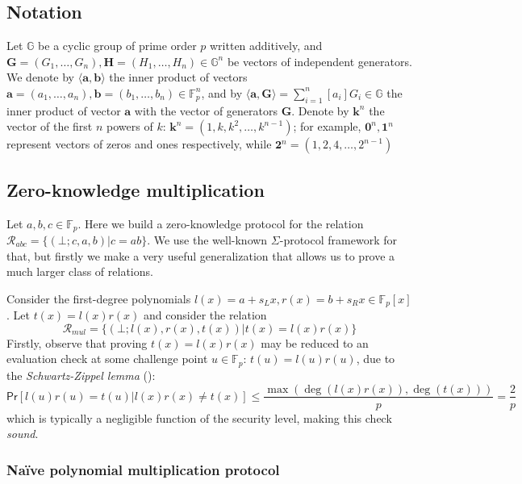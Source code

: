 \documentclass[../../book.tex]{subfiles}
\begin{document}
\subsection{Notation}
Let $\mathbb{G}$ be a cyclic group of prime order $p$ written additively, and $\mathbf{G} = (G_1, \dots, G_n), \mathbf{H} = (H_1, \dots, H_n) \in \mathbb{G}^n$ be vectors of independent generators. We denote by $\langle \mathbf{a,b} \rangle$ the inner product of vectors $\mathbf{a} = (a_1, \dots, a_n), \mathbf{b} = (b_1, \dots, b_n) \in \mathbb{F}_p^n$, and by $\langle \mathbf{a,G} \rangle = \sum_{i=1}^n [a_i] G_i \in \mathbb{G}$ the inner product of vector $\mathbf{a}$ with the vector of generators $\mathbf{G}$. Denote by $\mathbf{k}^n$ the vector of the first $n$ powers of $k$: $\mathbf{k}^n = (1, k, k^2, \dots, k^{n-1})$; for example, $\mathbf{0}^n, \mathbf{1}^n$ represent vectors of zeros and ones respectively, while $\mathbf{2}^{n} = (1, 2, 4, \dots, 2^{n-1})$

\subsection{Zero-knowledge multiplication}
Let $a,b,c \in \mathbb{F}_p$. Here we build a zero-knowledge protocol for the relation $\mathcal{R}_{abc} = \{ (\bot;c,a,b) \vert c=ab \}$. We use the well-known $\Sigma$-protocol framework for that, but firstly we make a very useful generalization that allows us to prove a much larger class of relations.

Consider the first-degree polynomials $l(x) = a + s_L x, r(x) = b + s_R x \in \mathbb{F}_p[x]$. Let $t(x) = l(x)r(x)$ and consider the relation
$$\mathcal{R}_{mul} = \{ (\bot;l(x),r(x),t(x)) \vert t(x) = l(x)r(x)\}$$
Firstly, observe that proving $t(x) = l(x)r(x)$ may be reduced to an evaluation check at some challenge point $u \in \mathbb{F}_p$: $t(u) = l(u)r(u)$, due to the \textit{Schwartz-Zippel lemma} ():
$$\mathsf{Pr}[l(u)r(u) = t(u) \vert l(x)r(x) \neq t(x)] \le \frac{\max(\deg(l(x)r(x)), \deg(t(x)))}{p} = \frac{2}{p}$$
which is typically a negligible function of the security level, making this check \textit{sound}.

\subsubsection{Naïve polynomial multiplication protocol}
\end{document}
